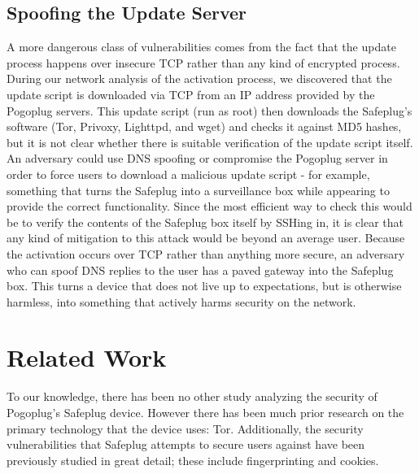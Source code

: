 \documentclass[conference]{IEEEtran}
\begin{document}
\subsection{Spoofing the Update Server}
\label{dnsspoof}
A more dangerous class of vulnerabilities comes from the fact that the update process happens over insecure TCP rather than any kind of encrypted process.  During our network analysis of the activation process, we discovered that the update script is downloaded via TCP from an IP address provided by the Pogoplug servers.  This update script (run as root) then downloads the Safeplug's software (Tor, Privoxy, Lighttpd, and wget) and checks it against MD5 hashes, but it is not clear whether there is suitable verification of the update script itself.  An adversary could use DNS spoofing or compromise the Pogoplug server in order to force users to download a malicious update script - for example, something that turns the Safeplug into a surveillance box while appearing to provide the correct functionality.  Since the most efficient way to check this would be to verify the contents of the Safeplug box itself by SSHing in, it is clear that any kind of mitigation to this attack would be beyond an average user.  Because the activation occurs over TCP rather than anything more secure, an adversary who can spoof DNS replies to the user has a paved gateway into the Safeplug box.  This turns a device that does not live up to expectations, but is otherwise harmless, into something that actively harms security on the network.

\section{Related Work}
To our knowledge, there has been no other study analyzing the security of Pogoplug's Safeplug device.  However there has been much prior research on the primary technology that the device uses: Tor.  Additionally, the security vulnerabilities that Safeplug attempts to secure users against have been previously studied in great detail; these include fingerprinting and cookies.  
\end{document}
